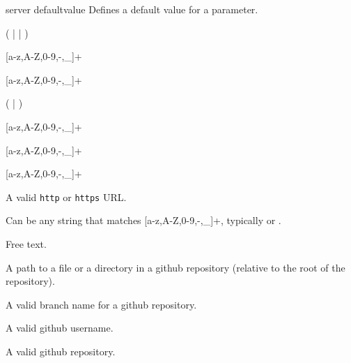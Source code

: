 \bigskip
\xmlstruct
{server}
{defaultvalue}
{%
Defines a default value for a parameter.
}



\bigskip
\noindent
{}

(  |  | )

\bigskip
\noindent
{}

[a-z,A-Z,0-9,-,\_]+

\bigskip
\noindent
{}

[a-z,A-Z,0-9,-,\_]+

\bigskip
\noindent
{}

(  |  )

\bigskip
\noindent
{}

[a-z,A-Z,0-9,-,\_]+

\bigskip
\noindent
{}

[a-z,A-Z,0-9,-,\_]+

\bigskip
\noindent
{}

[a-z,A-Z,0-9,-,\_]+

\bigskip
\noindent
{}

A valid \texttt{http} or \texttt{https} URL.

\bigskip
\noindent
{}

Can be any string that matches [a-z,A-Z,0-9,-,\_]+, typically
 or .

\bigskip
\noindent
{}

Free text.

\bigskip
\noindent
{}

A path to a file or a directory in a github repository (relative to
the root of the repository).

\bigskip
\noindent
{}

A valid branch name for a github repository.

\bigskip
\noindent
{}

A valid github username.

\bigskip
\noindent
{}

A valid github repository.

\bigskip
\noindent
{}

